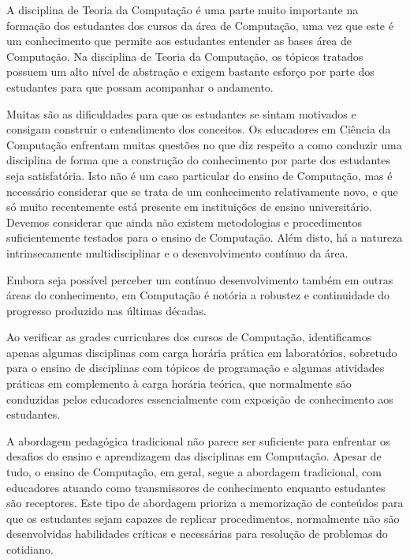 \newcommand{\publicacaoTemplate}[2]{%
\textbf{#1} : #2}


\acresetall
\label{cap-introducao}
A disciplina de Teoria da Computação é uma parte muito importante
na formação dos estudantes dos cursos da área de Computação, uma 
vez que este é um conhecimento que permite aos estudantes
entender as bases área de Computação.
Na disciplina de Teoria da Computação, os tópicos tratados
possuem um alto nível de abstração e exigem bastante esforço
por parte dos estudantes para que possam acompanhar o
andamento.

Muitas são as dificuldades para que os estudantes se sintam
motivados e consigam construir o entendimento dos conceitos.
Os educadores em Ciência da Computação enfrentam muitas questões no que diz
respeito a como conduzir uma disciplina de forma que a construção do conhecimento
por parte dos estudantes seja satisfatória.
Isto não é um caso particular do ensino de Computação,
mas é necessário considerar que se trata de um
conhecimento relativamente novo, e que só muito
recentemente está presente em instituições de ensino universitário.
Devemos considerar que ainda não existem metodologias e procedimentos
suficientemente testados para o ensino de Computação.
Além disto, há a natureza intrinsecamente multidisciplinar e
o desenvolvimento contínuo da área.

Embora seja possível perceber um contínuo desenvolvimento também em
outras áreas do conhecimento, em Computação é notória a robustez e
continuidade do progresso produzido nas últimas décadas.



Ao verificar as grades curriculares dos cursos de Computação,
identificamos apenas algumas disciplinas com carga horária prática
em laboratórios, sobretudo para o ensino de disciplinas com
tópicos de programação e algumas atividades práticas em
complemento à carga horária teórica,
que normalmente são conduzidas pelos educadores essencialmente com
exposição de conhecimento aos estudantes.

A abordagem pedagógica tradicional não parece ser suficiente para enfrentar
os desafios do ensino e aprendizagem das disciplinas
em Computação.
Apesar de tudo, o ensino de Computação, em geral, segue a abordagem
tradicional, com educadores atuando como transmissores de conhecimento
enquanto estudantes são receptores.
Este tipo de abordagem prioriza a memorização de conteúdos para
que os estudantes sejam capazes de replicar procedimentos,
normalmente não são desenvolvidas habilidades críticas e
necessárias para resolução de problemas do cotidiano.

